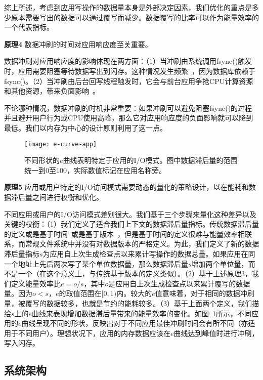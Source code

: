 综上所述，考虑到应用写操作的数据量本身是外部决定因素，我们优化的重点是多少原本需要写出的数据可以通过覆写而减少。数据覆写的比率可以作为能量效率的一个代表指标。

\textbf{原理4} 数据冲刷的时间对应用响应度至关重要。

数据冲刷对应用响应度的影响体现在两方面：（1）当冲刷由系统调用fsync()触发时，应用需要阻塞等待数据写出到闪存。这种情况发生频繁~\cite{Jeong:2013:ISO:2535461.2535499,Lee:2012:SLD:2380356.2380367}，因为数据库依赖于fsync()。（2）当冲刷由后台回写线程触发时，它会与前台应用争抢CPU计算资源和其他资源，带来负面影响~\cite{Kim:RSS:2012, Nguyen:2014:ISR:2638728.2638841}。

不论哪种情况，数据冲刷的时机非常重要：如果冲刷可以避免阻塞fsync()的过程并且避开用户行为或CPU使用高峰，那么它对应用响应度的负面影响就可以降到最低。我们以内存为中心的设计原则利用了这一点。

\begin{figure}
  \centering
  \texttt{[image: e-curve-app]}
  \caption{不同形状的$e$曲线表明特定于应用的I/O模式。图中数据滞后量的范围统一到0至100，实际数值标记在应用名称旁。}
  \label{fig:e-curve-app}
\end{figure}

\textbf{原理5} 应用或用户特定的I/O访问模式需要动态的量化的策略设计，以在能耗和数据滞后量之间进行权衡和优化。

不同应用或用户的I/O访问模式差别很大。我们基于三个步骤来量化这种差异以及关键的权衡：（1）我们定义了适合我们上下文的数据滞后量指标。传统数据滞后量的定义或是基于时间~\cite{Ports:2010:TCA:1924943.1924963}或是基于版本~\cite{Bailis:2012:PBS:2212351.2212359}，但是基于时间的定义很难与能量效率相联系，而常规文件系统中并没有对数据版本的严格定义。为此，我们定义了新的数据滞后量指标$s$为应用自上次生成检查点以来累计写操作的数据总量。如果应用在同一个地址上先后两次写了某个单位数据量，那么数据滞后量$s$增加两个单位量，而不是一个（在这个意义上，与传统基于版本的定义类似）。（2）基于上述原理3，我们定义能量效率比$e=o/s$，其中$o$是应用自上次生成检查点以来累计覆写的数据量。因为$o<s$，$e$的取值范围在$[0,1)$内。较大的$e$值意味着，对于相同的数据冲刷量，被覆写的数据较多，也就是节约的能耗较多。（3）基于上面两个定义，我们描绘$s$上的$e$曲线来表现增加数据滞后量带来的能量效率的变化。如图~\ref{fig:e-curve-app}所示，不同应用的$e$曲线呈现不同的形状，反映出对于不同应用最佳冲刷时间会有所不同（亦适用于不同用户）。理想状况下，应用的内存数据应该在$e$曲线达到峰值时进行冲刷，写入闪存。

\subsection{系统架构}

